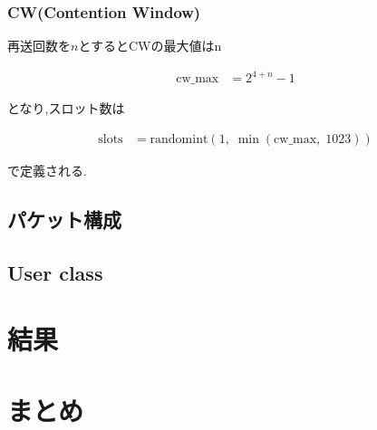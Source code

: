 \documentclass[a4paper, 10pt]{ltjsarticle}
\begin{document}
\subsubsection{CW(Contention Window)}

再送回数を$n$とするとCWの最大値はn

\begin{align}
  \text{cw\_max} &= 2^{4 + n} - 1
\end{align}

となり,スロット数は

\begin{align}
  \text{slots} &= \mathrm{randomint}(1, \; \min(\text{cw\_max}, \; 1023))
\end{align}

で定義される.


\subsection{パケット構成}

\subsection{User class}


\section{結果}


\section{まとめ}
\end{document}
